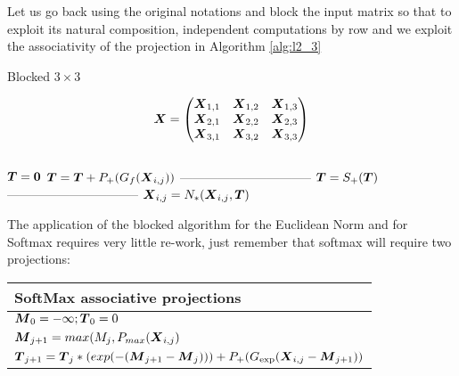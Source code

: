 \documentclass[acmsmall]{acmart}
\begin{document}
Let us go back using the original notations and block the input matrix
so that to exploit its natural composition, independent computations
by row and we exploit the associativity of the projection in Algorithm \ref{alg:l2_3}

\begin{algorithm}
    \caption{Blocked $3\times 3$}
    \label{alg:l2_3}
    \begin{algorithmic}
      \STATE \[
        {\boldsymbol X}  =   \begin{pmatrix}
          {\boldsymbol X}_{1,1} &    {\boldsymbol X}_{1,2}&    {\boldsymbol X}_{1,3}  \\
          {\boldsymbol X}_{2,1} &    {\boldsymbol X}_{2,2}&    {\boldsymbol X}_{2,3}  \\
          {\boldsymbol X}_{3,1} &    {\boldsymbol X}_{3,2}&    {\boldsymbol X}_{3,3}  \\
        \end{pmatrix}
      \] \\
          \STATE ${\boldsymbol T} = {\boldsymbol 0} $  
              \STATE ${\boldsymbol T} = {\boldsymbol T} +P_+(G_{f}({\boldsymbol X}_{i,j}))$   
          \ENDWHILE
          \STATE --------------------------------     
          \STATE ${\boldsymbol T}  =   S_+({\boldsymbol T})$       
          \STATE --------------------------------     
             \STATE $ {\boldsymbol X}_{i,j} = N_*({\boldsymbol X}_{i,j},{\boldsymbol T})$  
          \ENDWHILE
      \ENDWHILE
    \end{algorithmic}
\end{algorithm}

The application of the blocked algorithm for the Euclidean Norm and
for Softmax requires very little re-work, just remember that softmax
will require two projections:

\begin{center}
  \begin{tabular}{l}
    \hline
    SoftMax associative projections \\
    \hline 
    ${\boldsymbol M}_0 = -\infty; {\boldsymbol T}_0 = 0$ \\ 
    ${\boldsymbol M}_{j+1} = max(M_j, P_{max}({\boldsymbol X}_{i,j})$ \\
    ${\boldsymbol T}_{j+1} = {\boldsymbol T}_j*(exp(-({\boldsymbol M}_{j+1}-{\boldsymbol M}_j))) + P_+(G_{\exp}({\boldsymbol X}_{i,j}-{\boldsymbol M}_{j+1}))$ \\
  \end{tabular}
\end{center}
\end{document}
